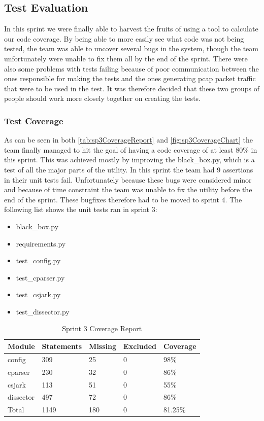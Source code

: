 \subsection{Test Evaluation}
In this sprint we were finally able to harvest the fruits of using a tool to calculate our code coverage. By being able to more easily see what code was not being tested, the team was able to uncover several bugs in the system, though the team unfortunately were unable to fix them all by the end of the sprint. There were also some problems with tests failing because of poor communication between the ones responsible for making the tests and the ones generating pcap \gls{packet} traffic that were to be used in the test. It was therefore decided that these two groups of people should work more closely together on creating the tests.



\subsubsection{Test Coverage}

As can be seen in both \autoref{tab:sp3CoverageReport} and \autoref{fig:sp3CoverageChart} the team finally managed to hit the goal of having a code coverage of at least 80\% in this sprint. This was achieved mostly by improving the black\_box.py, which is a test of all the major parts of the \gls{utility}. In this sprint the team had 9 assertions in their unit tests fail. Unfortunately because these bugs were considered minor and because of time constraint the team was unable to fix the \gls{utility} before the end of the sprint. These bugfixes therefore had to be moved to sprint 4. The following list shows the unit tests ran in sprint 3:
\begin{itemize}
	\item black\_box.py
	\item requirements.py
	\item test\_config.py
	\item test\_cparser.py
	\item test\_csjark.py
	\item test\_dissector.py
\end{itemize}

\begin{table}[!htb]\footnotesize\center
	\caption{Sprint 3 Coverage Report\label{tab:sp3CoverageReport}}
	\begin{tabular}{l l l l l}
		\toprule
		Module & Statements & Missing & Excluded & Coverage\\
		\midrule
		config & 309 & 25 & 0 & 98\%\ \\
		cparser & 230 & 32 & 0 & 86\%\ \\
		csjark & 113 & 51 & 0 & 55\%\ \\
		dissector & 497 & 72 & 0 & 86\%\ \\
		Total & 1149 & 180  & 0 & 81.25\%\ \\
		\bottomrule
	\end{tabular}
\end{table}

